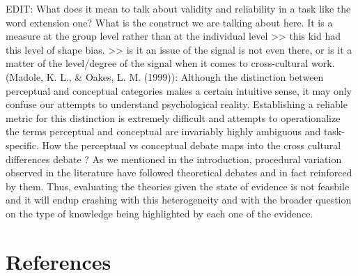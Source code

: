\documentclass[10pt, letterpaper]{article}
\begin{document}
EDIT: What does it mean to talk about validity and reliability in a task
like the word extension one? What is the construct we are talking about
here. It is a measure at the group level rather than at the individual
level \textgreater\textgreater{} this kid had this level of shape bias.
\textgreater\textgreater{} is it an issue of the signal is not even
there, or is it a matter of the level/degree of the signal when it comes
to cross-cultural work. (Madole, K. L., \& Oakes, L. M. (1999)):
Although the distinction between perceptual and conceptual categories
makes a certain intuitive sense, it may only confuse our attempts to
understand psychological reality. Establishing a reliable metric for
this distinction is extremely difficult and attempts to operationalize
the terms perceptual and conceptual are invariably highly ambiguous and
task-specific. How the perceptual vs conceptual debate maps into the
cross cultural differences debate ? As we mentioned in the introduction,
procedural variation observed in the literature have followed
theoretical debates and in fact reinforced by them. Thus, evaluating the
theories given the state of evidence is not feasbile and it will endup
crashing with this heterogeneity and with the broader question on the
type of knowledge being highlighted by each one of the evidence.

\hypertarget{references}{%
\section{References}\label{references}}

\setlength{\parindent}{-0.1in} 
\setlength{\leftskip}{0.125in}

\noindent
\end{document}
